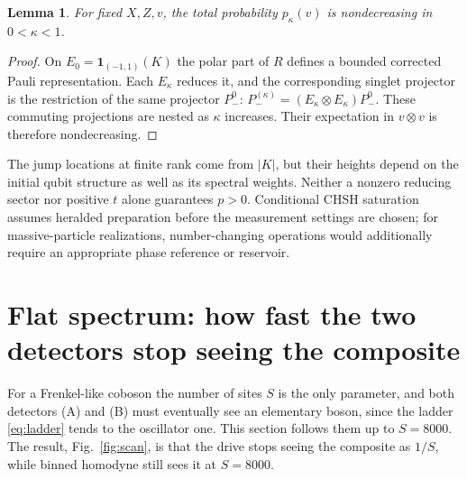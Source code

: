\documentclass[11pt,a4paper]{article}
\newtheorem{lemma}{Lemma}
\begin{document}
\begin{lemma}
\label{lem:cutoff}
For fixed $X,Z,v$, the total probability $p_\kappa(v)$ is nondecreasing in $0<\kappa<1$.
\end{lemma}
\begin{proof}
On $E_0=\mathbf1_{(-1,1)}(K)$ the polar part of $R$ defines a bounded corrected Pauli representation. Each $E_\kappa$ reduces it, and the corresponding singlet projector is the restriction of the same projector $P_-^0$:
$P_-^{(\kappa)}=(E_\kappa\otimes E_\kappa)P_-^0$. These commuting projections are nested as $\kappa$ increases. Their expectation in $v\otimes v$ is therefore nondecreasing.
\end{proof}
The jump locations at finite rank come from $|K|$, but their heights depend on the initial qubit structure as well as its spectral weights. Neither a nonzero reducing sector nor positive $t$ alone guarantees $p>0$. Conditional CHSH saturation assumes heralded preparation before the measurement settings are chosen; for massive-particle realizations, number-changing operations would additionally require an appropriate phase reference or reservoir.

\section{Flat spectrum: how fast the two detectors stop seeing the composite}
\label{sec:finite}

For a Frenkel-like coboson the number of sites $S$ is the only parameter, and both detectors (A) and (B) must eventually see an elementary boson, since the ladder \eqref{eq:ladder} tends to the oscillator one. This section follows them up to $S=8000$. The result, Fig.~\ref{fig:scan}, is that the drive stops seeing the composite as $1/S$, while binned homodyne still sees it at $S=8000$.
\end{document}
